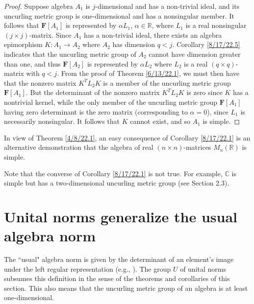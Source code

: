 \documentclass{amsart}
\numberwithin{equation}{section}
\theoremstyle{definition}
\numberwithin{theorem}{section}
\begin{document}
\begin{proof} Suppose algebra $A_1$ is $j$-dimensional and has a non-trivial ideal, and its uncurling metric group is one-dimensional and has a nonsingular member.  It follows that $\mathbf{F}[A_1]$ is represented by  $\alpha L_1$, $\alpha\in \mathbb{R}$, where $L_1$ is a real nonsingular $(j\times j)$-matrix.  Since $A_1$ has a non-trivial ideal, there exists an algebra epimorphism $K:A_1\rightarrow A_2$ where $A_2$ has dimension $q<j$.  Corollary \ref{8/17/22.5} indicates that the uncurling metric group of $A_2$ cannot have dimension greater than one, and thus $\mathbf{F}[A_2]$ is represented by $\alpha L_2$ where $L_2$ is a real $(q\times q)$-matrix with $q<j$. From the proof of Theorem \ref{6/13/22.1}, we must then have that the nonzero matrix $ K^T L_2 K$ is a member of the uncurling metric group $\mathbf{F}[A_1]$.  But the determinant of the nonzero matrix $ K^T L_2 K$ is zero since $K$ has a nontrivial kernel, while the only member of the uncurling metric group $\mathbf{F}[A_1]$ having zero determinant is the zero matrix (corresponding to $\alpha=0$), since $L_1$ is necessarily nonsingular.   It follows that $K$ cannot exist, and so $A_1$ is simple. \end{proof}


In view of Theorem \ref{4/8/22.1}, an easy consequence of Corollary \ref{8/17/22.1} is an alternative demonstration that the algebra of real $(n\times n)$-matrices $ M_n(\mathbb{R})$ is simple.  

Note that the converse of Corollary \ref{8/17/22.1} is not true.  For example, $\mathbb{C}$ is simple but has a two-dimensional uncurling metric group (see Section 2.3).


\section{Unital norms generalize the usual algebra norm} 
The ``usual" algebra norm is given by the determinant of an element's image under the left regular representation (e.g., \cite{bourbaki:1989}).  The group $U$ of unital norms subsumes this definition in the sense of the theorems and corollaries of this section.  This also means that the uncurling metric group of an algebra is at least one-dimensional.
\end{document}
